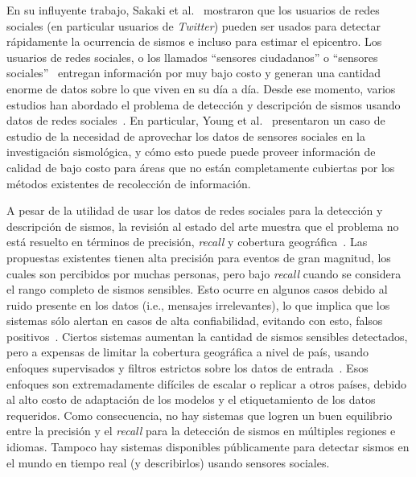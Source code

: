 En su influyente trabajo, Sakaki et al.~\cite{sakaki2010earthquake} mostraron que los usuarios de redes sociales (en particular usuarios de \textit{Twitter}) pueden ser usados para detectar rápidamente la ocurrencia de sismos e incluso para estimar el epicentro.
%
Los usuarios de redes sociales, o los llamados ``sensores ciudadanos'' o ``sensores sociales''~\cite{sheth2009citizen} entregan información por muy bajo costo y generan una cantidad enorme de datos sobre lo que viven en su día a día. 
%
Desde ese momento, varios estudios han abordado el problema de detección y descripción de sismos usando datos de redes sociales~\cite{avvenuti2014ears,cameron2012emergency,earle2010omg,earle2012twitter}. 
%
En particular, Young et al.~\cite{young2013transforming} presentaron un caso de estudio de la necesidad de aprovechar los datos de sensores sociales en la investigación sismológica, y cómo esto puede puede proveer información de calidad de bajo costo para áreas que no están completamente cubiertas por los métodos existentes de recolección de información.


A pesar de la utilidad de usar los datos de redes sociales para la detección y descripción de sismos, la revisión al estado del arte muestra que el problema no está resuelto en términos de precisión, {\em recall} y cobertura geográfica~\cite{young2013transforming}.
%
Las propuestas existentes tienen alta precisión para eventos de gran magnitud, los cuales son percibidos por muchas personas, pero bajo {\em recall} cuando se considera el rango completo de sismos sensibles.
%
Esto ocurre en algunos casos debido al ruido presente en los datos (i.e., mensajes irrelevantes), lo que implica que los sistemas sólo alertan en casos de alta confiabilidad, evitando con esto, falsos positivos~\cite{earle2010omg,earle2012twitter,avvenuti2014ears}.
%
Ciertos sistemas aumentan la cantidad de sismos sensibles detectados, pero a expensas de limitar la cobertura geográfica a nivel de país, usando enfoques supervisados y filtros estrictos sobre los datos de entrada~\cite{avvenuti2014ears,sakaki2013tweet}.
%
Esos enfoques son extremadamente difíciles de escalar o replicar a otros países, debido al alto costo de adaptación de los modelos y el etiquetamiento de los datos requeridos.
%
Como consecuencia, no hay sistemas que logren un buen equilibrio entre la precisión y el {\em recall} para la detección de sismos en múltiples regiones e idiomas. 
%
Tampoco hay sistemas disponibles públicamente para detectar sismos en el mundo en tiempo real (y describirlos) usando sensores sociales. 


